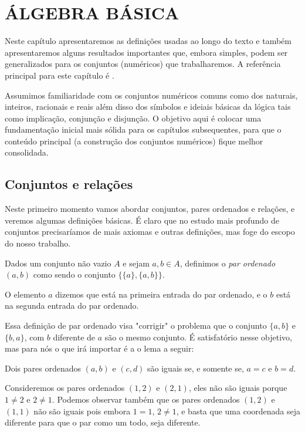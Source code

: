 \documentclass[../main.tex]{subfiles}
\begin{document}
\chapter{ÁLGEBRA BÁSICA}

Neste capítulo apresentaremos as definições usadas ao longo do texto e também apresentaremos alguns resultados importantes que, embora simples, podem ser generalizados para os conjuntos (numéricos) que trabalharemos. A referência principal para este capítulo é \Parencite{domingues-iezzi-2018}.

Assumimos familiaridade com os conjuntos numéricos comuns como dos naturais, inteiros, racionais e reais além disso dos símbolos e ideiais básicas da lógica tais como implicação, conjunção e disjunção. O objetivo aqui é colocar uma fundamentação inicial mais sólida para os capítulos subsequentes, para que o conteúdo principal (a construção dos conjuntos numéricos) fique melhor consolidada. 

\section{Conjuntos e relações}
Neste primeiro momento vamos abordar conjuntos, pares ordenados e relações, e veremos algumas definições básicas. É claro que no estudo mais profundo de conjuntos precisaríamos de mais axiomas e outras definições, mas foge do escopo do nosso trabalho.

\begin{defi}\label{agb-def-parOrd}
     Dados um conjunto não vazio $A$ e sejam $a,b \in A$, definimos o \emph{par ordenado} $(a,b)$ como sendo o conjunto $\{\{a\}, \{a,b\}\}$.
\end{defi}
    O elemento $a$ dizemos que está na primeira entrada do par ordenado, e o $b$ está na segunda entrada do par ordenado.
    
    Essa definição de par ordenado visa "corrigir" o problema que o conjunto $\{a,b\}$ e $\{b,a\}$, com $b$ diferente de $a$ são o mesmo conjunto.
    É satisfatório nesse objetivo, mas para nós o que irá importar é a o lema a seguir:
\begin{lema}
    Dois pares ordenados $(a,b)$ e $(c,d)$ são iguais se, e somente se, $a=c$ e $b=d$.
\end{lema}
Consideremos os pares ordenados $(1,2)$ e $(2,1)$, eles não são iguais porque $1 \neq 2$ e $2 \neq 1$. Podemos observar também que os pares ordenados $(1,2)$ e $(1,1)$ não são iguais pois embora $1=1$, $2 \neq 1$, e basta que uma coordenada seja diferente para que o par como um todo, seja diferente.
\end{document}
